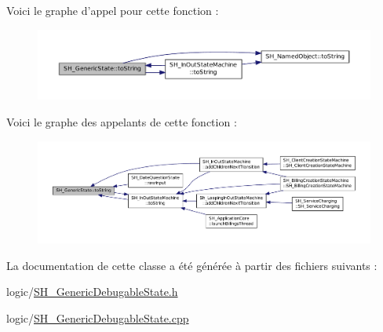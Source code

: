 Voici le graphe d'appel pour cette fonction \-:
\nopagebreak
\begin{figure}[H]
\begin{center}
\leavevmode
\includegraphics[width=350pt]{classSH__GenericState_a5480c5ee725fd801d8f6292cd4c803b8_cgraph}
\end{center}
\end{figure}




Voici le graphe des appelants de cette fonction \-:
\nopagebreak
\begin{figure}[H]
\begin{center}
\leavevmode
\includegraphics[width=350pt]{classSH__GenericState_a5480c5ee725fd801d8f6292cd4c803b8_icgraph}
\end{center}
\end{figure}




La documentation de cette classe a été générée à partir des fichiers suivants \-:\begin{DoxyCompactItemize}
\item 
logic/\hyperlink{SH__GenericDebugableState_8h}{S\-H\-\_\-\-Generic\-Debugable\-State.\-h}\item 
logic/\hyperlink{SH__GenericDebugableState_8cpp}{S\-H\-\_\-\-Generic\-Debugable\-State.\-cpp}\end{DoxyCompactItemize}
